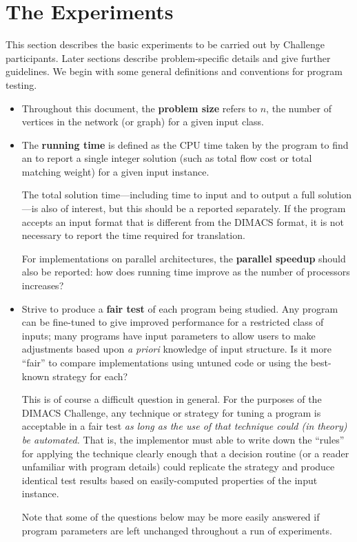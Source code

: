 \section{The Experiments}

This section describes the basic experiments to be carried out by
Challenge participants.  Later sections describe problem-specific
details and give further guidelines.  We begin with some general
definitions and conventions for program testing.

\begin{itemize} 
\item Throughout this document, the {\bf problem size} refers to $n$, the 
number of vertices in the network (or graph) for a given input class.

\item The {\bf running time} is defined as the CPU time taken 
by the program to find an to report a single integer solution (such as
total flow cost or total matching weight) for a given input instance.

The total solution time---including time to input and to output a full
solution---is also of interest, but this should be a reported
separately.  If the program accepts an input format that is different
from the DIMACS format, it is not necessary to report the time
required for translation.

For implementations on parallel architectures, the {\bf parallel
speedup} should also be reported: how does running time improve as the
number of processors increases?

\item Strive to produce a {\bf fair test} of each program being
studied.  Any program can be fine-tuned to give improved performance
for a restricted class of inputs; many programs have input parameters
to allow users to make adjustments based upon {\em a priori} knowledge
of input structure.  Is it more ``fair'' to compare implementations
using untuned code or using the best-known strategy for each?

This is of course a difficult question in general.  For the purposes
of the DIMACS Challenge, any technique or strategy for tuning a
program is acceptable in a fair test {\em as long as the use of that
technique could (in theory) be automated.} That is, the implementor
must able to write down the ``rules'' for applying the technique
clearly enough that a decision routine (or a reader unfamiliar with
program details) could replicate the strategy and produce identical
test results based on easily-computed properties of the input
instance.

Note that some of the questions below may be more easily answered if
program parameters are left unchanged throughout a run of experiments.

\end{itemize} 

